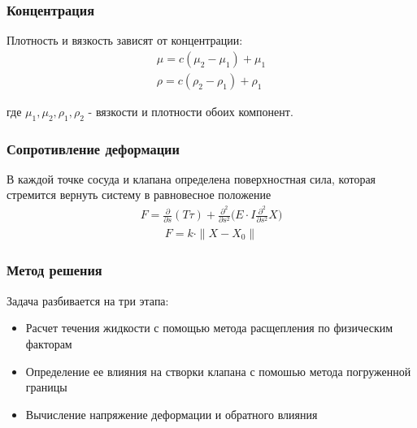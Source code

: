 \documentclass[14pt]{beamer}
\begin{document}
\begin{frame}
\frametitle{Концентрация}
Плотность и вязкость зависят от концентрации:
\begin{gather}
    \label{eq:concentration_viscosity}
    \mu = c (\mu_2 - \mu_1) + \mu_1\\
    \label{eq:concentration_density}
    \rho = c (\rho_2 - \rho_1) + \rho_1
\end{gather}

где $\mu_1, \mu_2, \rho_1, \rho_2$ - вязкости и плотности обоих компонент.
\end{frame}

\begin{frame}
\frametitle{Сопротивление деформации}
В каждой точке сосуда и клапана определена поверхностная сила, которая стремится вернуть систему в равновесное положение
\begin{gather}
    \label{eq:strain_energy}
    F =  \frac{\partial}{\partial s}(T \tau) + \frac{\partial^2}{\partial s^2} \Big( E \cdot I \frac{\partial^2}{\partial s^2} X \Big)
\end{gather}
\begin{gather}
    \label{eq:define_boundary_force}
    F = k \cdot \|X - X_0\|
\end{gather}
\end{frame}

\begin{frame}
\frametitle{Метод решения}
Задача разбивается на три этапа:
\begin{itemize}
    \item[\MVRightarrow] Расчет течения жидкости с помощью метода расщепления по физическим факторам
    \item[\MVRightarrow] Определение ее влияния на створки клапана с помошью метода погруженной границы
    \item[\MVRightarrow] Вычисление напряжение деформации и обратного влияния
\end{itemize}

\end{frame}
\end{document}

